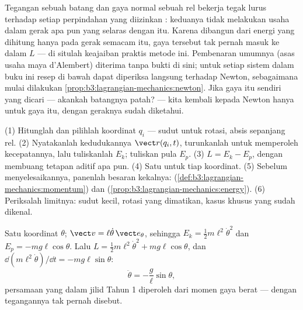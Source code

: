 \begin{remark}\label{rem:b3:lagrangian-mechanics:constraints}
Tegangan sebuah batang dan gaya normal sebuah rel bekerja tegak lurus
terhadap setiap perpindahan yang diizinkan : keduanya tidak
melakukan usaha dalam gerak apa pun yang selaras dengan  itu.
Karena  dibangun dari energi yang dihitung hanya pada gerak
semacam itu, gaya tersebut tak pernah masuk ke dalam $L$ --- di situlah
keajaiban praktis metode ini. Pembenaran umumnya (asas usaha maya
d'Alembert) diterima tanpa bukti di sini; untuk setiap sistem dalam buku
ini resep di bawah dapat diperiksa langsung terhadap Newton,
sebagaimana mulai dilakukan \cref{prop:b3:lagrangian-mechanics:newton}.
Jika gaya  itu sendiri yang dicari --- akankah batangnya patah?
--- kita kembali kepada Newton hanya untuk gaya itu, dengan geraknya
sudah diketahui.
\end{remark}

\begin{method}\label{met:b3:lagrangian-mechanics:recipe}
(1) Hitunglah  dan pilihlah koordinat $q_i$ ---
sudut untuk rotasi, absis sepanjang rel. (2) Nyatakanlah kedudukannya
$\vect r(q_i, t)$, turunkanlah untuk memperoleh kecepatannya, lalu
tuliskanlah $E_k$; tuliskan pula $E_p$. (3) $L = E_k - E_p$, dengan
membuang tetapan aditif apa pun. (4) Satu 
untuk tiap koordinat. (5) Sebelum menyelesaikannya, panenlah besaran
kekalnya: 
(\cref{def:b3:lagrangian-mechanics:momentum}) dan 
(\cref{prop:b3:lagrangian-mechanics:energy}). (6) Periksalah limitnya:
sudut kecil, rotasi yang dimatikan, kasus khusus yang sudah dikenal.
\end{method}

\begin{example}\label{ex:b3:lagrangian-mechanics:pendulum}
Satu koordinat $\theta$; $\vect v = \ell\dot\theta\,\vect e_\theta$,
sehingga $E_k = \tfrac12 m\ell^2\dot\theta^2$ dan
$E_p = -mg\ell\cos\theta$. Lalu
$L = \tfrac12 m\ell^2\dot\theta^2 + mg\ell\cos\theta$, dan
$\dd(m\ell^2\dot\theta)/\dd t = -mg\ell\sin\theta$:
\[
\ddot\theta = -\frac{g}{\ell}\sin\theta ,
\]
persamaan yang dalam jilid Tahun 1 diperoleh dari momen gaya berat ---
dengan tegangannya tak pernah disebut.
\end{example}

